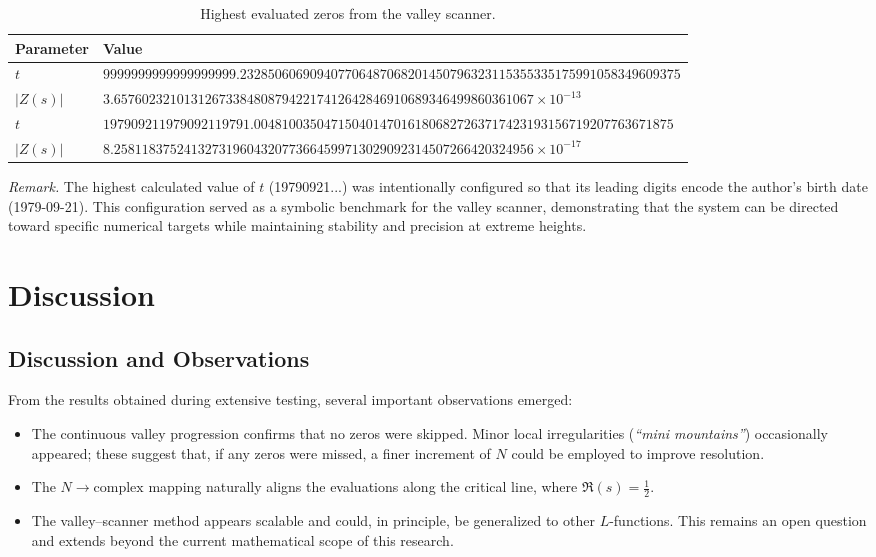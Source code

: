 \documentclass[11pt,a4paper]{article}
\begin{document}
\begin{table}[H]
\centering
\small
\caption{Highest evaluated zeros from the valley scanner.}
\begin{tabular}{ll}
\hline
\textbf{Parameter} & \textbf{Value} \\
\hline
$t$ & $9999999999999999999.232850606909407706487068201450796323115355335175991058349609375$ \\
$|Z(s)|$ & $3.657602321013126733848087942217412642846910689346499860361067\times10^{-13}$ \\
\hline
$t$ & $197909211979092119791.004810035047150401470161806827263717423193156719207763671875$ \\
$|Z(s)|$ & $8.258118375241327319604320773664599713029092314507266420324956\times10^{-17}$ \\
\hline
\end{tabular}
\label{tab:highest_t_values}
\end{table}

\noindent\textit{Remark.}
The highest calculated value of $t$ (19790921...) was intentionally configured so that its leading digits encode the author’s birth date (1979-09-21).
This configuration served as a symbolic benchmark for the valley scanner, 
demonstrating that the system can be directed toward specific numerical targets while maintaining stability and precision at extreme heights.

\section{Discussion}
\label{sec:discussion}
\subsection{Discussion and Observations}

From the results obtained during extensive testing, several important observations emerged:

\begin{itemize}
    \item The continuous valley progression confirms that no zeros were skipped.  
    Minor local irregularities (\emph{``mini mountains''}) occasionally appeared; these suggest that, if any zeros were missed, a finer increment of \( N \) could be employed to improve resolution.
    \item The \( N \rightarrow \text{complex} \) mapping naturally aligns the evaluations along the critical line, where \( \Re(s) = \tfrac{1}{2} \).
    \item The valley--scanner method appears scalable and could, in principle, be generalized to other \( L \)-functions.  
    This remains an open question and extends beyond the current mathematical scope of this research.
\end{itemize}
\end{document}
